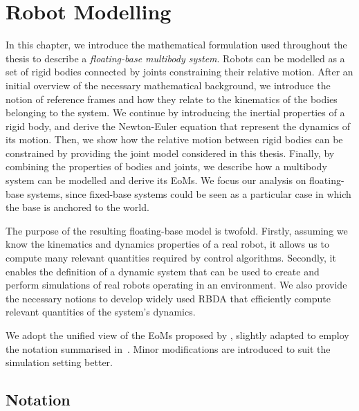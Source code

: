 \chapter{Robot Modelling}
\label{ch:robot_modelling}

In this chapter, we introduce the mathematical formulation used throughout the thesis to describe a \emph{floating-base multibody system}.
Robots can be modelled as a set of rigid bodies connected by joints constraining their relative motion.
After an initial overview of the necessary mathematical background, we introduce the notion of reference frames and how they relate to the kinematics of the bodies belonging to the system.
We continue by introducing the inertial properties of a rigid body, and derive the Newton-Euler equation that represent the dynamics of its motion.
Then, we show how the relative motion between rigid bodies can be constrained by providing the joint model considered in this thesis.
Finally, by combining the properties of bodies and joints, we describe how a multibody system can be modelled and derive its \aclp{EoM}.
We focus our analysis on floating-base systems, since fixed-base systems could be seen as a particular case in which the base is anchored to the world.

The purpose of the resulting floating-base model is twofold.
Firstly, assuming we know the kinematics and dynamics properties of a real robot, it allows us to compute many relevant quantities required by control algorithms.
Secondly, it enables the definition of a dynamic system that can be used to create and perform simulations of real robots operating in an environment.
We also provide the necessary notions to develop widely used \ac{RBDA} that efficiently compute relevant quantities of the system's dynamics.

We adopt the unified view of the \acp{EoM} proposed by \textcite{traversaro_unied_2017}, slightly adapted to employ the notation summarised in~\textcite{traversaro_multibody_2019}.
Minor modifications are introduced to suit the simulation setting better.

\section{Notation}

